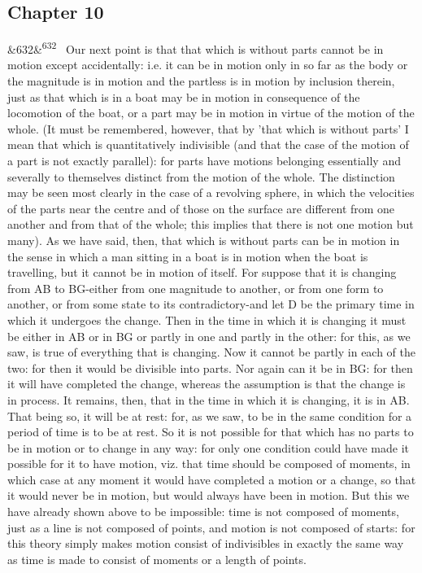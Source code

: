 \documentclass[12pt]{article}
\newcommand{\para}[1][]{\par\noindent\ifx&#1&\else\textsuperscript{\footnotesize #1}~\fi}
\begin{document}
\subsection*{Chapter 10}

\para[632] Our next point is that that which is without parts cannot be in motion except accidentally: i.e. it can be in motion only in so far as the body or the magnitude is in motion and the partless is in motion by inclusion therein, just as that which is in a boat may be in motion in consequence of the locomotion of the boat, or a part may be in motion in virtue of the motion of the whole. (It must be remembered, however, that by 'that which is without parts' I mean that which is quantitatively indivisible (and that the case of the motion of a part is not exactly parallel): for parts have motions belonging essentially and severally to themselves distinct from the motion of the whole. The distinction may be seen most clearly in the case of a revolving sphere, in which the velocities of the parts near the centre and of those on the surface are different from one another and from that of the whole; this implies that there is not one motion but many). As we have said, then, that which is without parts can be in motion in the sense in which a man sitting in a boat is in motion when the boat is travelling, but it cannot be in motion of itself. For suppose that it is changing from AB to BG-either from one magnitude to another, or from one form to another, or from some state to its contradictory-and let D be the primary time in which it undergoes the change. Then in the time in which it is changing it must be either in AB or in BG or partly in one and partly in the other: for this, as we saw, is true of everything that is changing. Now it cannot be partly in each of the two: for then it would be divisible into parts. Nor again can it be in BG: for then it will have completed the change, whereas the assumption is that the change is in process. It remains, then, that in the time in which it is changing, it is in AB. That being so, it will be at rest: for, as we saw, to be in the same condition for a period of time is to be at rest. So it is not possible for that which has no parts to be in motion or to change in any way: for only one condition could have made it possible for it to have motion, viz. that time should be composed of moments, in which case at any moment it would have completed a motion or a change, so that it would never be in motion, but would always have been in motion. But this we have already shown above to be impossible: time is not composed of moments, just as a line is not composed of points, and motion is not composed of starts: for this theory simply makes motion consist of indivisibles in exactly the same way as time is made to consist of moments or a length of points.
\end{document}
